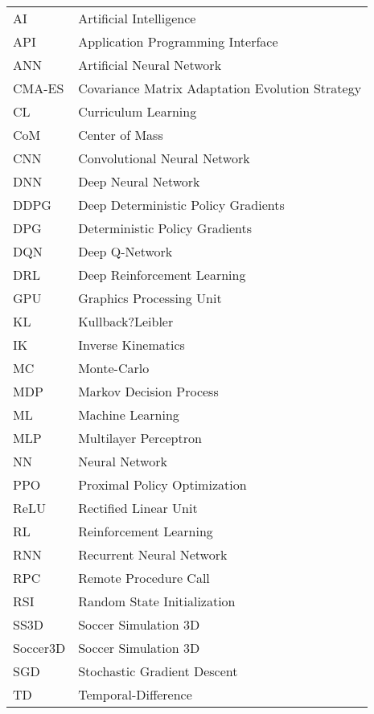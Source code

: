 \begin{longtable}{ll}
AI & Artificial Intelligence \\
API & Application Programming Interface \\
ANN & Artificial Neural Network \\
CMA-ES & Covariance Matrix Adaptation Evolution Strategy \\
CL & Curriculum Learning \\
CoM & Center of Mass \\
CNN & Convolutional Neural Network \\
DNN & Deep Neural Network \\
DDPG & Deep Deterministic Policy Gradients \\
DPG & Deterministic Policy Gradients \\
DQN & Deep Q-Network \\
DRL & Deep Reinforcement Learning \\
GPU & Graphics Processing Unit \\
KL & Kullback?Leibler \\
IK & Inverse Kinematics \\
MC & Monte-Carlo \\
MDP & Markov Decision Process \\
ML & Machine Learning \\
MLP & Multilayer Perceptron \\
NN & Neural Network \\
PPO & Proximal Policy Optimization \\ 
ReLU & Rectified Linear Unit \\
RL & Reinforcement Learning \\
RNN & Recurrent Neural Network \\
RPC & Remote Procedure Call \\
RSI & Random State Initialization \\
SS3D & Soccer Simulation 3D \\
Soccer3D & Soccer Simulation 3D \\
SGD & Stochastic Gradient Descent \\
TD & Temporal-Difference \\

\end{longtable}

